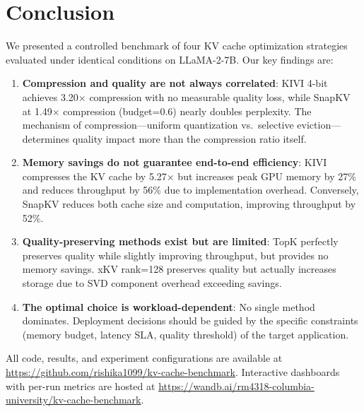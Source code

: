 \documentclass[conference]{IEEEtran}
\begin{document}
\section{Conclusion}

We presented a controlled benchmark of four KV cache optimization strategies evaluated under identical conditions on LLaMA-2-7B. Our key findings are:

\begin{enumerate}
    \item \textbf{Compression and quality are not always correlated}: KIVI 4-bit achieves 3.20$\times$ compression with no measurable quality loss, while SnapKV at 1.49$\times$ compression (budget=0.6) nearly doubles perplexity. The mechanism of compression---uniform quantization vs.\ selective eviction---determines quality impact more than the compression ratio itself.
    \item \textbf{Memory savings do not guarantee end-to-end efficiency}: KIVI compresses the KV cache by 5.27$\times$ but increases peak GPU memory by 27\% and reduces throughput by 56\% due to implementation overhead. Conversely, SnapKV reduces both cache size and computation, improving throughput by 52\%.
    \item \textbf{Quality-preserving methods exist but are limited}: TopK perfectly preserves quality while slightly improving throughput, but provides no memory savings. xKV rank=128 preserves quality but actually increases storage due to SVD component overhead exceeding savings.
    \item \textbf{The optimal choice is workload-dependent}: No single method dominates. Deployment decisions should be guided by the specific constraints (memory budget, latency SLA, quality threshold) of the target application.
\end{enumerate}

All code, results, and experiment configurations are available at \url{https://github.com/rishika1099/kv-cache-benchmark}. Interactive dashboards with per-run metrics are hosted at \url{https://wandb.ai/rm4318-columbia-university/kv-cache-benchmark}.


\end{document}

